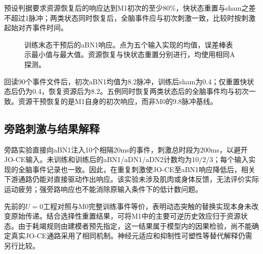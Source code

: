 预设判据要求资源恢复后的响应达到M1初次的至少80\%，快状态重置与sham之差不超过1脉冲；两类状态同时恢复后，全脑事件应与初次刺激一致，比较时按刺激起始对齐事件时间。

\begin{figure}[!htbp]\centering
{}
\caption{训练末态干预后的aBN1响应。点为五个输入实现的均值，误差棒表示最小值与最大值。资源恢复与快状态重置分别进行，均使用相同A探测。}
\label{fig:causal}
\end{figure}

回读90个事件文件后，初次aBN1均值为8.2脉冲，训练后sham为0.4；仅重置快状态后仍为0.4，恢复资源后为8.2。五例同时恢复两类状态后的全脑事件均与初次一致。资源干预恢复的是M1自身的初次响应，而非M0的9.8脉冲基线。

\subsection{旁路刺激与结果解释}
旁路实验直接向aBN1注入10个相隔20ms的事件，刺激总时段为200ms，以避开JO-CE输入。未训练和训练后的aBN1/aDN1/aDN2计数均为10/2/3；每个输入实现的全脑事件记录也一致。因此，在重复刺激使JO-CE至aBN1响应降低后，相关下游通路仍能对直接驱动作出响应。该实验未涉及肌肉或身体反馈，无法评价实际运动疲劳；强旁路响应也不能消除原输入条件下的低计数问题。

先前的$U=0$工程对照与M0完整训练事件等价，表明动态突触的替换实现本身未改变原始传递。结合选择性重置结果，可将M1中的主要可逆历史效应归于资源状态。由于耗竭规则由建模者预先指定，这一结果属于模型内的因果检验，尚不能确定真实JO-CE通路采用了相同机制。神经元适应和抑制性可塑性等替代解释仍需另行比较。
\FloatBarrier
